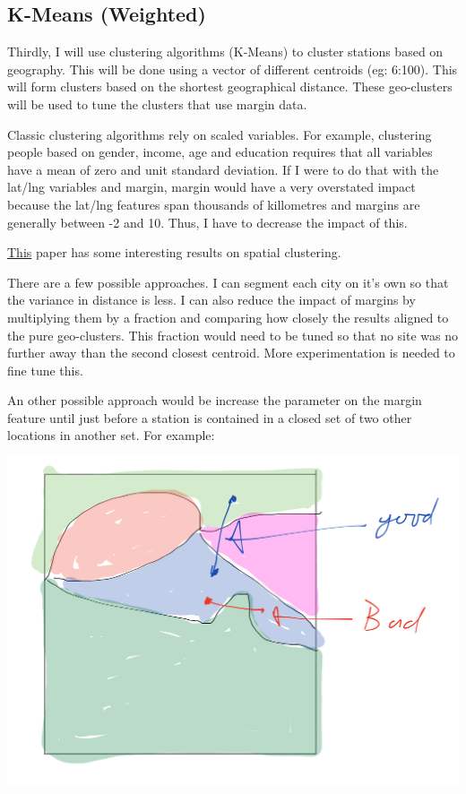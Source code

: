 \documentclass[11pt]{article}
\begin{document}
\subsection{K-Means (Weighted)}
\label{sec:org3169899}
Thirdly, I will use clustering algorithms (K-Means) to cluster stations based on
geography. This will be done using a vector of different centroids (eg: 6:100).
This will form clusters based on the shortest geographical distance. These
geo-clusters will be used to tune the clusters that use margin data.

Classic clustering algorithms rely on scaled variables. For example, clustering
people based on gender, income, age and education requires that all variables
have a mean of zero and unit standard deviation. If I were to do that with the
lat/lng variables and margin, margin would have a very overstated impact because
the lat/lng features span thousands of killometres and margins are generally
between -2 and 10. Thus, I have to decrease the impact of this. 

\href{https://pdfs.semanticscholar.org/77e7/55fba9432219dba7bd83302044f2e86e5056.pdf}{This} paper has some interesting results on spatial clustering.


There are a few possible approaches. I can segment each city on it's own so that
the variance in distance is less. I can also reduce the impact of margins by
multiplying them by a fraction and comparing how closely the results aligned to
the pure geo-clusters. This fraction would need to be tuned so that no site was
no further away than the second closest centroid. More experimentation is needed
to fine tune this. 

An other possible approach would be increase the parameter on the margin feature
until just before a station is contained in a closed set of two other locations
in another set. For example:

\begin{center}
\includegraphics[angle=0,width=15cm]{./img/IMG_0147.jpg}
\end{center}
\end{document}
